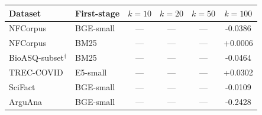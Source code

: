 \begin{tabular}{llSSSS}
\toprule
\textbf{Dataset} & \textbf{First-stage} & \textbf{$k=10$} & \textbf{$k=20$} & \textbf{$k=50$} & \textbf{$k=100$} \\
\midrule
NFCorpus & BGE-small & {---} & {---} & {---} & -0.0386 \\
NFCorpus & BM25 & {---} & {---} & {---} & +0.0006 \\
BioASQ-subset$^{\dagger}$ & BM25 & {---} & {---} & {---} & -0.0464 \\
TREC-COVID & E5-small & {---} & {---} & {---} & +0.0302 \\
SciFact & BGE-small & {---} & {---} & {---} & -0.0109 \\
ArguAna & BGE-small & {---} & {---} & {---} & -0.2428 \\
\bottomrule
\end{tabular}

